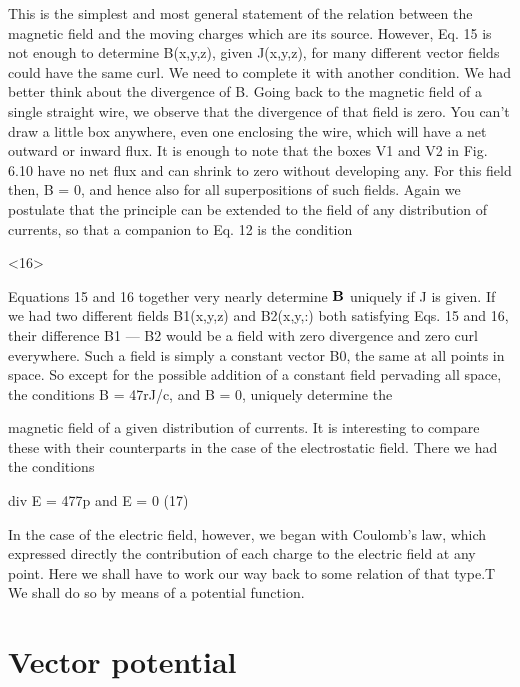 This is the simplest and most general statement of the relation between
the magnetic field and the moving charges which are its source.
However, Eq. 15 is not enough to determine B(x,y,z), given
J(x,y,z), for many different vector fields could have the same curl.
We need to complete it with another condition. We had better think
about the divergence of B. Going back to the magnetic field of a
single straight wire, we observe that the divergence of that field is
zero. You can't draw a little box anywhere, even one enclosing the
wire, which will have a net outward or inward flux. It is enough to
note that the boxes V1 and V2 in Fig. 6.10 have no net flux and can
shrink to zero without developing any. For this field then, \div B = 0,
and hence also for all superpositions of such fields. Again we postulate
that the principle can be extended to the field of any distribution
of currents, so that a companion to Eq. 12 is the condition

\begin{equation}
\end{equation}
<16>

Equations 15 and 16 together very nearly determine $\mathbf{B}$ uniquely
if J is given. If we had two different fields B1(x,y,z) and B2(x,y,:)
both satisfying Eqs. 15 and 16, their difference B1 --- B2 would be a
field with zero divergence and zero curl everywhere. Such a field is
simply a constant vector B0, the same at all points in space. So except
for the possible addition of a constant field pervading all space, the
conditions \curl B = 47rJ/c, and \div B = 0, uniquely determine the

magnetic field of a given distribution of currents. It is interesting
to compare these with their counterparts in the case of the electrostatic
field. There we had the conditions

\begin{equation}
\end{equation}
div E = 477p and \curl E = 0 (17)

In the case of the electric field, however, we began with Coulomb's
law, which expressed directly the contribution of each charge to the
electric field at any point. Here we shall have to work our way back
to some relation of that type.T We shall do so by means of a potential
function.

\section{Vector potential}

